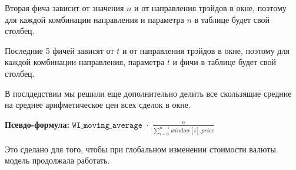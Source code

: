 Вторая фича зависит от значения $n$ и от направления трэйдов в окне, поэтому для каждой комбинации направления и параметра $n$ в таблице будет свой столбец.

Последние 5 фичей зависят от $t$ и от направления трэйдов в окне, поэтому для каждой комбинации направления, параметра $t$ и фичи в таблице будет свой столбец.

В послдедствии мы решили еще дополнительно делить все скользящие средние на среднее арифметическое цен всех сделок в окне. 

\textbf{Псевдо-формула:} $\texttt{WI\_moving\_average} \; \cdot \; \frac{n}{\sum\limits_{i=0}^{n - 1} window[i].price}$ 

Это сделано для того, чтобы при глобальном изменении стоимости валюты модель продолжала работать.